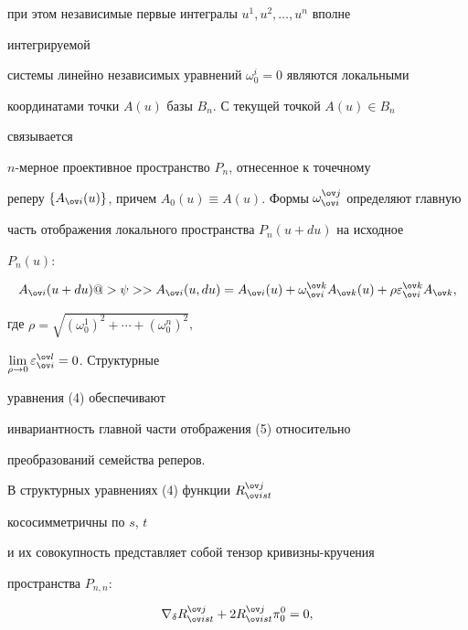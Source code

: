 при этом независимые первые интегралы $u^1,u^2,\dotsc,u^n$ вполне 


интегрируемой 


системы линейно независимых уравнений $\omega^i_0=0$ являются локальными 


координатами точки $A(u)$ базы $B_n$. С текущей точкой $A(u)\in B_n$ 


связывается 


$n$-мерное проективное пространство $P_n$, отнесенное к точечному 


реперу $\{A_{\ov i}(u)\}$, причем $A_0(u)\equiv A(u)$. Формы $\omega^{\ov 


j}_{\ov i}$ определяют главную 


часть отображения локального пространства $P_n(u+du)$ на исходное 


$P_n(u)$: 


\begin{equation} 


A_{\ov i}(u+du)@>{\psi}>> A_{\ov i}(u,du)= 


A_{\ov i}(u)+\omega^{\ov k}_{\ov i}A_{\ov k}(u)+ 


\rho\varepsilon^{\ov k}_{\ov i}A_{\ov k}, 


\end{equation} 


где $\rho=\sqrt{(\omega^1_0)^2+\dotsb+(\omega^n_0)^2}$, 


$\lim\limits_{\rho\to0}\varepsilon^{\ov l}_{\ov i}=0$. Структурные 


уравнения (4) обеспечивают 


инвариантность главной части отображения (5) относительно 


преобразований семейства реперов. 


 


В структурных уравнениях (4) функции $R^{\ov j}_{\ov i st}$ 


кососимметричны по $s$, $t$ 


и их совокупность представляет собой тензор кривизны-кручения 


пространства $P_{n,n}$: 


\begin{equation} 


\nabla_\delta R^{\ov j}_{\ov i st}+2R^{\ov j}_{\ov i st} 


\pi^0_0=0, 


\end{equation} 


